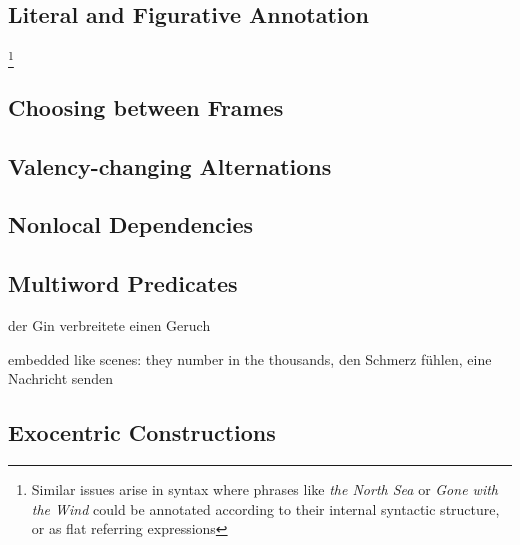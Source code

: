 \documentclass[a4paper]{article}
\begin{document}
\subsection{Literal and Figurative Annotation}

\footnote{Similar issues arise in syntax where phrases like \emph{the North Sea} or \emph{Gone with the Wind} could be annotated according to their internal syntactic structure, or as flat referring expressions}

\subsection{Choosing between Frames}

\subsection{Valency-changing Alternations}

\subsection{Nonlocal Dependencies}

\subsection{Multiword Predicates}

der Gin verbreitete einen Geruch

embedded like scenes: they number in the thousands, den Schmerz fühlen, eine Nachricht senden

\subsection{Exocentric Constructions}

%
%
\end{document}
